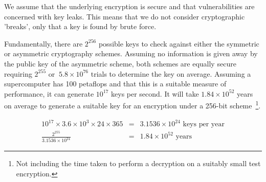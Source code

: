 We assume that the underlying encryption is secure and that vulnerabilities are concerned with key leaks. This means that we do not consider cryptographic 'breaks', only that a key is found by brute force.

Fundamentally, there are $2^{256}$ possible keys to check against either the symmetric or asymmetric cryptography schemes. Assuming no information is given away by the public key of the asymmetric scheme, both schemes are equally secure requiring $2^{255}$ or $~5.8 \times 10^{76}$ trials to determine the key on average. Assuming a supercomputer has 100 petaflops and that this is a suitable measure of performance, it can generate $10^{17}$ keys per second. It will take $1.84 \times 10^{52}$ years on average to generate a suitable key for an encryption under a 256-bit scheme~\footnote{Not including the time taken to perform a decryption on a suitably small test encryption.}.

$$
\begin{aligned}
  10^{17} \times 3.6 \times 10^{3} \times 24 \times 365 &=& 3.1536 \times 10^{24} \text{ keys per year} \\
  \frac{2^{255}}{3.1536 \times 10^{24}} &=& 1.84 \times 10^{52} \text{ years}
\end{aligned}
$$
